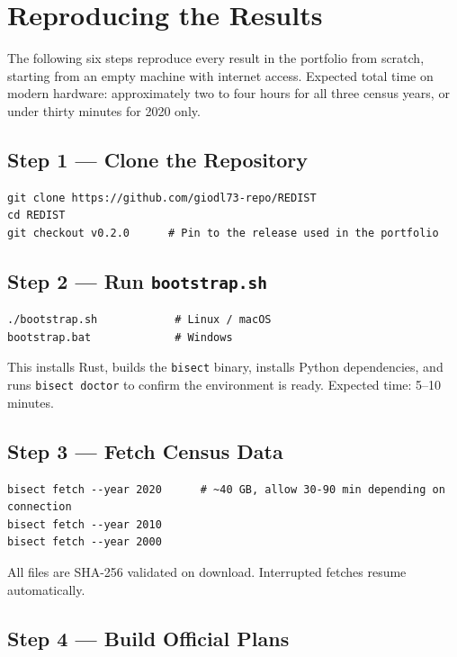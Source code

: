 
\section{Reproducing the Results}
\label{sec:reproduction}

The following six steps reproduce every result in the portfolio from scratch,
starting from an empty machine with internet access.
Expected total time on modern hardware: approximately two to four hours
for all three census years, or under thirty minutes for 2020 only.

\subsection*{Step 1 --- Clone the Repository}

\begin{verbatim}
git clone https://github.com/giodl73-repo/REDIST
cd REDIST
git checkout v0.2.0      # Pin to the release used in the portfolio
\end{verbatim}

\subsection*{Step 2 --- Run \texttt{bootstrap.sh}}

\begin{verbatim}
./bootstrap.sh            # Linux / macOS
bootstrap.bat             # Windows
\end{verbatim}

\noindent This installs Rust, builds the \texttt{bisect} binary, installs
Python dependencies, and runs \texttt{bisect doctor} to confirm the
environment is ready.  Expected time: 5--10 minutes.

\subsection*{Step 3 --- Fetch Census Data}

\begin{verbatim}
bisect fetch --year 2020      # ~40 GB, allow 30-90 min depending on connection
bisect fetch --year 2010
bisect fetch --year 2000
\end{verbatim}

\noindent All files are SHA-256 validated on download.
Interrupted fetches resume automatically.

\subsection*{Step 4 --- Build Official Plans}

